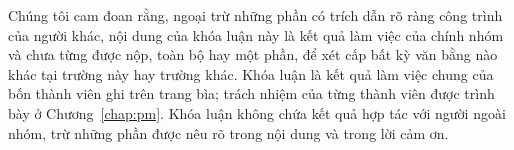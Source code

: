 
\begin{declaration}

Chúng tôi cam đoan rằng, ngoại trừ những phần có trích dẫn rõ ràng công trình
của người khác, nội dung của khóa luận này là kết quả làm việc của chính nhóm và
chưa từng được nộp, toàn bộ hay một phần, để xét cấp bất kỳ văn bằng nào khác tại
trường này hay trường khác. Khóa luận là kết quả làm việc chung của bốn thành
viên ghi trên trang bìa; trách nhiệm của từng thành viên được trình bày ở
Chương~\ref{chap:pm}. Khóa luận không chứa kết quả hợp tác với người ngoài
nhóm, trừ những phần được nêu rõ trong nội dung và trong lời cảm ơn.

\end{declaration}
